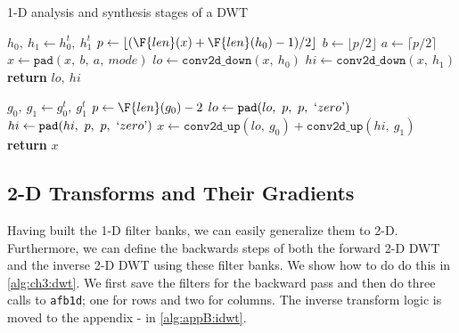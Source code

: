 \begin{algorithm}[tb]
\caption{1-D analysis and synthesis stages of a DWT}\label{alg:ch3:fb1d}
\begin{algorithmic}[1]
  \label{alg:ch3:afb1d}
    \State $h_0,\ h_1 \gets h_0^t,\ h_1^t$  
  \EndIf
  \State $p \gets \lfloor (\F{len}(x) + \F{len}(h_0) - 1) / 2 \rfloor$ 
  \State $b \gets \lfloor p/2 \rfloor$ 
  \State $a \gets \lceil p/2 \rceil$ 
  \State $x \gets \mathtt{pad}(x,\ b,\ a,\ mode)$ 
  \State $lo \gets \mathtt{conv2d\_down} (x,\ h_0)$
  \State $hi \gets \mathtt{conv2d\_down} (x,\ h_1)$
  \State \textbf{return} $lo,\ hi$
\EndFunction
\end{algorithmic}\vspace{10pt}
\begin{algorithmic}[1]
  \label{alg:ch3:sfb1d}
    \State $g_0,\ g_1 \gets g_0^t,\ g_1^t$  
  \EndIf
  \State $p \gets \F{len}(g_0) - 2$ 
  \State $lo \gets \mathtt{pad}(lo,\ p,\ p,\ `zero \textrm')$ 
  \State $hi \gets \mathtt{pad}(hi,\ p,\ p,\ `zero \textrm')$ 
  \State $x \gets \mathtt{conv2d\_up}(lo,\ g_0) + \mathtt{conv2d\_up}(hi,\ g_1)$
  \State \textbf{return} $x$
\EndFunction
\end{algorithmic}
\end{algorithm}

\subsection{2-D Transforms and Their Gradients}\label{sec:ch3:2d_dwt}
Having built the 1-D filter banks, we can easily generalize them to 2-D.
Furthermore, we can define the backwards steps of both the forward 2-D DWT
and the inverse 2-D DWT using these filter banks. We show how to do do this in
\autoref{alg:ch3:dwt}. We first save the filters for the backward pass and then
do three calls to \texttt{afb1d}; one for rows and two for columns. 
The inverse transform logic is moved to the appendix - in
\autoref{alg:appB:idwt}.

